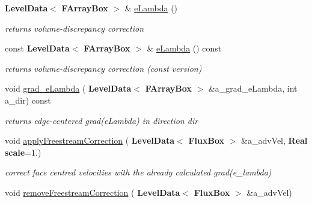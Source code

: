 \begin{DoxyCompactItemize}
\mbox{\label{class_projector_ac2cd27b388f9bb0b0c689929236eb99e}} 
\textbf{ Level\+Data}$<$ \textbf{ F\+Array\+Box} $>$ \& \hyperlink{class_projector_ac2cd27b388f9bb0b0c689929236eb99e}{e\+Lambda} ()
\begin{DoxyCompactList}\small\item\em returns volume-\/discrepancy correction \end{DoxyCompactList}\item 
\mbox{\label{class_projector_afe65831dec803c572b906df514517b9e}} 
const \textbf{ Level\+Data}$<$ \textbf{ F\+Array\+Box} $>$ \& \hyperlink{class_projector_afe65831dec803c572b906df514517b9e}{e\+Lambda} () const
\begin{DoxyCompactList}\small\item\em returns volume-\/discrepancy correction (const version) \end{DoxyCompactList}\item 
\mbox{\label{class_projector_a0e99730057058f22d19854baaa3c14e7}} 
void \hyperlink{class_projector_a0e99730057058f22d19854baaa3c14e7}{grad\+\_\+e\+Lambda} (\textbf{ Level\+Data}$<$ \textbf{ F\+Array\+Box} $>$ \&a\+\_\+grad\+\_\+e\+Lambda, int a\+\_\+dir) const
\begin{DoxyCompactList}\small\item\em returns edge-\/centered grad(e\+Lambda) in direction dir \end{DoxyCompactList}\item 
\mbox{\label{class_projector_a907f799a7ed29d3a3b0e3e5af52f5e3d}} 
void \hyperlink{class_projector_a907f799a7ed29d3a3b0e3e5af52f5e3d}{apply\+Freestream\+Correction} (\textbf{ Level\+Data}$<$ \textbf{ Flux\+Box} $>$ \&a\+\_\+adv\+Vel, \textbf{ Real} \textbf{ scale}=1.)
\begin{DoxyCompactList}\small\item\em correct face centred velocities with the already calculated grad(e\+\_\+lambda) \end{DoxyCompactList}\item 
\mbox{\label{class_projector_a8184919e3f6703bbdcc725ed01b5f0db}} 
void \hyperlink{class_projector_a8184919e3f6703bbdcc725ed01b5f0db}{remove\+Freestream\+Correction} (\textbf{ Level\+Data}$<$ \textbf{ Flux\+Box} $>$ \&a\+\_\+adv\+Vel)

\end{DoxyCompactItemize}
